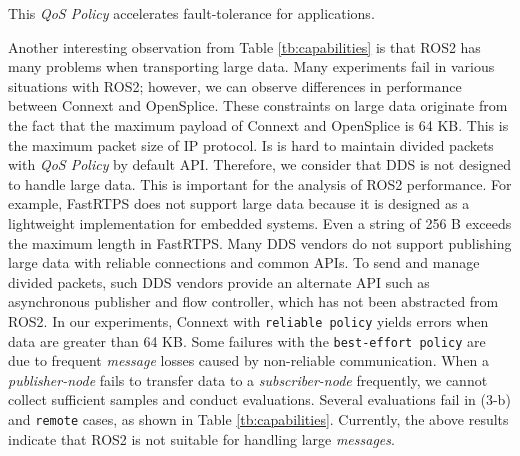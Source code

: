 \documentclass{sig-alternate-05-2015}
\begin{document}
This \emph{QoS Policy} accelerates fault-tolerance for applications.

Another interesting observation from Table \ref{tb:capabilities} is that ROS2 has many problems when transporting large data.
Many experiments fail in various situations with ROS2; however, we can observe differences in performance between Connext and OpenSplice.
These constraints on large data originate from the fact that the maximum payload of Connext and OpenSplice is 64 KB.
This is the maximum packet size of IP protocol.
Is is hard to maintain divided packets with \emph{QoS Policy} by default API.
Therefore, we consider that DDS is not designed to handle large data.
This is important for the analysis of ROS2 performance.
For example, FastRTPS does not support large data because it is designed as a lightweight implementation for embedded systems. 
Even a string of 256 B exceeds the maximum length in FastRTPS.
Many DDS vendors do not support publishing large data with reliable connections and common APIs.
To send and manage divided packets, such DDS vendors provide an alternate API such as asynchronous publisher and flow controller, which has not been abstracted from ROS2. 
In our experiments, Connext with \texttt{reliable policy} yields errors when data are greater than 64 KB.
Some failures with the \texttt{best-effort policy} are due to frequent \emph{message} losses caused by non-reliable communication. 
When a \emph{publisher-node} fails to transfer data to a \emph{subscriber-node} frequently, we cannot collect sufficient samples and conduct evaluations.
Several evaluations fail in (3-b) and \texttt{remote} cases, as shown in Table \ref{tb:capabilities}.
Currently, the above results indicate that ROS2 is not suitable for handling large \emph{messages}.
\end{document}
